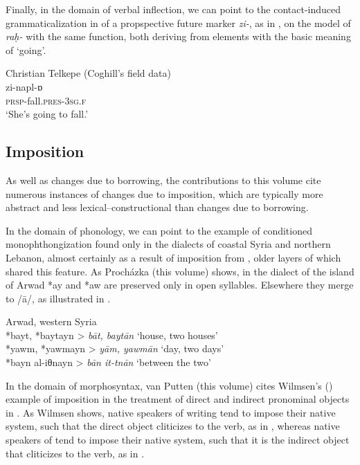 \documentclass[output=paper]{langsci/langscibook}
\begin{document}
Finally, in the domain of verbal {inflection}, we can point to the {contact-induced grammaticalization} in  of a propspective {future} marker \textit{zi-}, as in , on the model of  \textit{raḥ-} with the same function, both deriving from elements with the basic meaning of `going'.

\ea\label{introgoing}Christian Telkepe  (Coghill’s field data)\\
\gll zi-napl-ɒ\\
     \textsc{prsp-}fall.\textsc{pres}{}-\textsc{3sg.f}\\
\glt ‘She’s going to fall.’
\z

\subsection{Imposition}


As well as changes due to borrowing, the contributions to this volume cite numerous instances of changes due to {imposition}, which are typically more abstract and less lexical--constructional than changes due to borrowing.


In the domain of phonology, we can point to the example of conditioned monophthongization found only in the  dialects of coastal Syria and northern Lebanon, almost certainly as a result of {imposition} from , older layers of which shared this feature. As Procházka (this volume)  shows, in the dialect of the island of Arwad *ay and *aw are preserved only in open syllables. Elsewhere they {merge} to /ā/, as illustrated in .


\ea\label{intromonophth}
{Arwad, western Syria \citep[278]{Procházka2013}} \\
    *bayt, *baytayn > \textit{bāt, baytān} ‘house, two houses’\\
*yawm, *yawmayn >  \textit{yām, yawmān} ‘day, two days’\\
*bayn al-iθnayn > \textit{bān it-tnān} ‘between the two’\\
\z

In the domain of morphosyntax, van Putten (this volume) cites Wilmsen's (\citeyear{Wilmsen2010}) example of {imposition} in the treatment of direct and indirect pronominal objects in . As Wilmsen shows, native speakers of  writing  tend to impose their native system, such that the direct object cliticizes to the verb, as in , whereas native speakers of   tend to impose their native system, such that it is the indirect object that cliticizes to the verb, as in .
\end{document}
